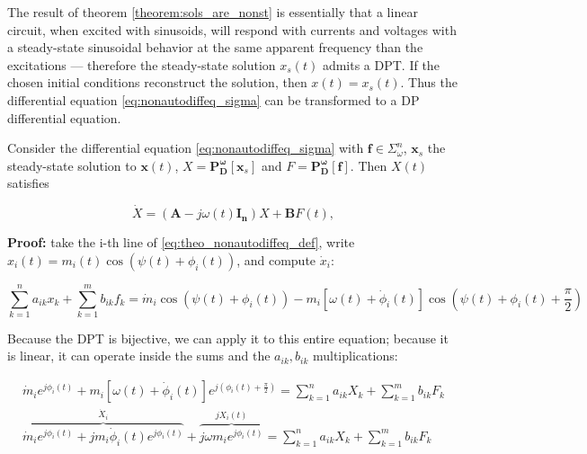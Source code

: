 	The result of theorem \ref{theorem:sols_are_nonst} is essentially that a linear circuit, when excited with sinusoids, will respond with currents and voltages with a steady-state sinusoidal behavior at the same apparent frequency than the excitations — therefore the steady-state solution $x_s(t)$ admits a DPT. If the chosen initial conditions reconstruct the solution, then $x(t) = x_s(t)$. Thus the differential equation \eqref{eq:nonautodiffeq_sigma} can be transformed to a DP differential equation.

\begin{theorem}\label{theo:dp_diffeq} %
	Consider the differential equation \eqref{eq:nonautodiffeq_sigma} with $\mathbf{f}\in\Sigma_\omega^n$, $\mathbf{x}_s$ the steady-state solution to $\mathbf{x}(t)$, $X = \mathbf{P_D^\omega}\left[\mathbf{x}_s\right]$ and $F = \mathbf{P_D^\omega}\left[\mathbf{f}\right]$. Then $X(t)$ satisfies

\begin{equation} \dot{X} = \left(\mathbf{A} - j\omega(t)\mathbf{I_n}\right)X + \mathbf{B}F(t), \label{eq:theo_nonautodiffeq_def}\end{equation}

\end{theorem}
\textbf{Proof:} take the i-th line of \eqref{eq:theo_nonautodiffeq_def}, write $x_i(t) = m_i(t)\cos\left(\psi(t) + \phi_i(t)\right)$, and compute $\dot{x}_i$:

\begin{equation} \sum\limits_{k=1}^n a_{ik} x_k + \sum\limits_{k=1}^m b_{ik} f_k = \dot{m}_i \cos\left(\psi(t) + \phi_i(t)\right) - m_i\left[\omega(t) + \dot{\phi}_i(t)\right] \cos\left(\psi(t) + \phi_i(t) + \dfrac{\pi}{2}\right) \end{equation}

	Because the DPT is bijective, we can apply it to this entire equation; because it is linear, it can operate inside the sums and the $a_{ik},b_{ik}$ multiplications:

\begin{gather}
	\dot{m}_ie^{j\phi_i(t)} + m_i\left[\omega(t) + \dot{\phi}_i(t)\right]e^{j\left(\phi_i(t) + \frac{\pi}{2}\right)} = \sum\limits_{k=1}^n a_{ik} X_k + \sum\limits_{k=1}^m b_{ik} F_k \\[3mm] 
	\overbrace{\dot{m}_ie^{j\phi_i(t)} + jm_i \dot{\phi}_i(t)e^{j\phi_i(t)}}^{\dot{X}_i} + \overbrace{j\omega m_i e^{j\phi_i(t)}}^{jX_i(t)} = \sum\limits_{k=1}^n a_{ik} X_k + \sum\limits_{k=1}^m b_{ik} F_k
\end{gather}

